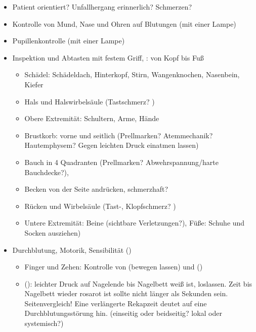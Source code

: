 {%
\begin{itemize}
  \item Patient orientiert? Unfallhergang erinnerlich? Schmerzen?
  \item Kontrolle von Mund, Nase und Ohren auf Blutungen (mit einer
  Lampe)
  \item Pupillenkontrolle (mit einer
  Lampe)
  \item Inspektion und Abtasten mit festem Griff, : von Kopf bis Fuß
  \begin{itemize}
    \item Schädel: Schädeldach, Hinterkopf,
    Stirn, Wangenknochen, Nasenbein, Kiefer
    \item Hals und Halswirbelsäule 
    (Tastschmerz? 
    )
    \item Obere Extremität: Schultern, Arme, Hände
    \item Brustkorb: vorne und seitlich 
    (Prellmarken?
    Atemmechanik? 
    Hautemphysem? 
    Gegen leichten Druck einatmen lassen)
    \item Bauch in 4 Quadranten (Prellmarken?
    Abwehrspannung/harte Bauchdecke?),
    \item Becken von der Seite andrücken, schmerzhaft?
    \item Rücken und Wirbelsäule (Tast-, Klopfschmerz?
    )
    \item Untere Extremität: Beine (sichtbare Verletzungen?), Füße:
    Schuhe und Socken ausziehen)
  \end{itemize}
  \item Durchblutung, Motorik, Sensibilität ()\label{topic:dms}
  \begin{itemize}
    \item \label{topic:dms} Finger und Zehen: Kontrolle von
     (bewegen lassen) und 
    () 
    \item {} ():
    leichter Druck auf Nagelende bis Nagelbett weiß ist,
    loslassen. Zeit bis Nagelbett wieder rosarot ist sollte
    nicht länger als  Sekunden sein.
    Seitenvergleich! Eine verlängerte Rekapzeit deutet auf
    eine Durchblutungsstörung hin. (einseitig oder
    beidseitig? lokal oder systemisch?)
  \end{itemize}

\end{itemize}}
